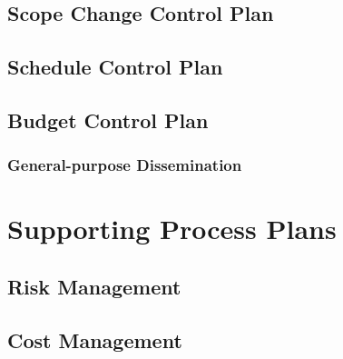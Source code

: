 \documentclass{article}
\begin{document}
\subsection{Scope Change Control Plan}
\lipsum[1]

\subsection{Schedule Control Plan}
\lipsum[1]

\subsection{Budget Control Plan}
\lipsum[1]


\subsubsection{General-purpose Dissemination}
\lipsum[1]

\section{Supporting Process Plans}
\lipsum[1]

\subsection{Risk Management}
\lipsum[1]


\subsection{Cost Management}
\lipsum[1]

\newpage
\printbibliography
\end{document}
